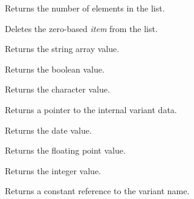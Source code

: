 Returns the number of elements in the list.

\label{wxvariantdelete}


Deletes the zero-based {\it item} from the list.

\label{wxvariantgetarraystring}


Returns the string array value.

\label{wxvariantgetbool}


Returns the boolean value.

\label{wxvariantgetchar}


Returns the character value.

\label{wxvariantgetdata}


Returns a pointer to the internal variant data.

\label{wxvariantgetdatetime}


Returns the date value.

\label{wxvariantgetdouble}


Returns the floating point value.

\label{wxvariantgetlong}


Returns the integer value.

\label{wxvariantgetname}


Returns a constant reference to the variant name.

\label{wxvariantgetstring}


